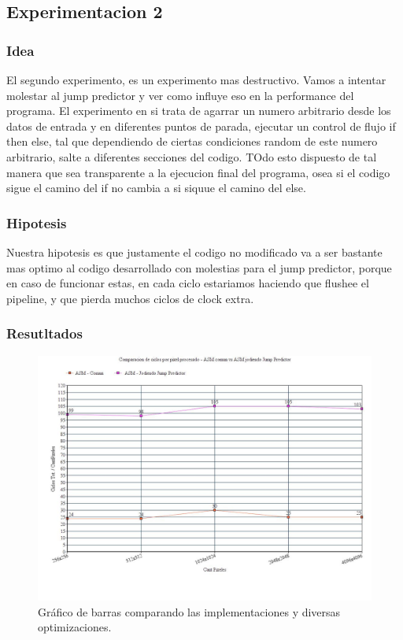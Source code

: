 	

\subsection{Experimentacion 2}	

\subsubsection{Idea}
	El segundo experimento, es un experimento mas destructivo. Vamos a intentar molestar al jump predictor y ver como influye eso en la  performance del programa. 
	El experimento en si trata de agarrar un numero arbitrario desde los datos de entrada y en diferentes puntos de parada, ejecutar un control de flujo if then else, tal que dependiendo de ciertas condiciones random de este numero arbitrario, salte  a diferentes secciones del codigo. TOdo esto dispuesto de tal manera que sea transparente a la ejecucion final del programa, osea si el codigo sigue el camino del if no cambia a si siquue el camino del else.

\subsubsection{Hipotesis}
	Nuestra hipotesis es que justamente el codigo no modificado va a ser bastante mas optimo al codigo desarrollado con molestias para el jump predictor, porque en caso de funcionar estas, en cada ciclo estariamos haciendo que flushee el pipeline, y que pierda muchos ciclos de clock extra.
	
\subsubsection{Resutltados}

\medskip\begin{figure}[h!]
\centering
\captionsetup{justification=centering}
	\includegraphics[width = 15 cm, height = 8 cm]{imagenes/JumpPredictor.jpg}
	\caption[center]{Gráfico de barras comparando las implementaciones y diversas optimizaciones.}
\end{figure}


